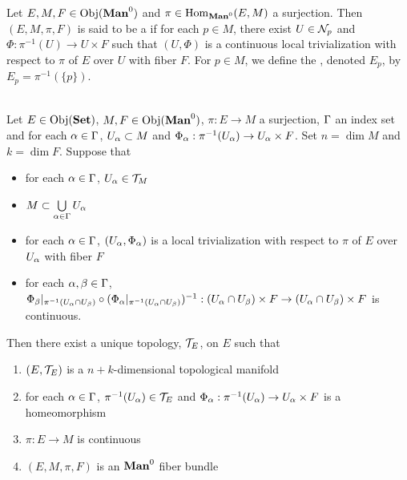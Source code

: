 \documentclass{book}
\begin{document}
	\begin{defn}
		Let $E,M, F \in \Obj(\Man0)$ and $\pi \in \Hom_{\Man0}(E, M)$ a surjection. Then $(E, M, \pi, F)$ is said to be a  if for each $p \in M$, there exist $U \in \mathcal{N}_p$ and $\Phi: \pi^{-1}(U) \rightarrow U \times F$ such that $(U, \Phi)$ is a continuous local trivialization with respect to $\pi$ of $E$ over $U$ with fiber $F$. For $p \in M$, we define the , denoted $E_p$, by $E_p = \pi^{-1}(\{p\})$.
	\end{defn}

	\begin{ex}  \\
		Let $E \in \operatorname{Obj}(\operatorname*{\text{\textbf{Set}}})$, $M, F \in \Obj(\Man0)$, $\pi: E \rightarrow M$ a surjection, $\Gamma$ an index set and for each $\alpha \in \Gamma$, $U_{\alpha} \subset M$ and $\Phi_{\alpha}: \pi^{-1}(U_{\alpha}) \rightarrow U_{\alpha} \times F$. Set $n = \dim M$ and $k = \dim F$. Suppose that 
		\begin{itemize}
			\item for each $\alpha \in \Gamma$, $U_{\alpha} \in \mathcal{T}_M$
			\item $M \subset \bigcup\limits_{\alpha \in \Gamma} U_{\alpha}$ 
			\item for each $\alpha \in \Gamma$, $(U_{\alpha}, \Phi_{\alpha})$ is a local trivialization with respect to $\pi$ of $E$ over $U_{\alpha}$ with fiber $F$ 
			\item for each $\alpha,\beta \in \Gamma$, $\Phi_{\beta}|_{\pi^{-1}(U_{\alpha} \cap U_{\beta})} \circ (\Phi_{\alpha}|_{\pi^{-1}(U_{\alpha} \cap U_{\beta})})^{-1}: (U_{\alpha} \cap U_{\beta}) \times F \rightarrow  (U_{\alpha} \cap U_{\beta}) \times F$ is continuous.
		\end{itemize}
		Then there exist a unique topology, $\mathcal{T}_E$, on $E$ such that
		\begin{enumerate}
			\item $(E, \mathcal{T}_E)$ is a $n+k$-dimensional topological manifold 
			\item for each $\alpha \in \Gamma$, $ \pi^{-1}(U_{\alpha}) \in \mathcal{T}_E$ and $\Phi_{\alpha}: \pi^{-1}(U_{\alpha}) \rightarrow U_{\alpha} \times F$ is a homeomorphism
			\item $\pi: E \rightarrow M$ is continuous
			\item $(E, M, \pi, F)$ is an $\Man0$ fiber bundle
		\end{enumerate}
	\end{ex}
	
\end{document}
